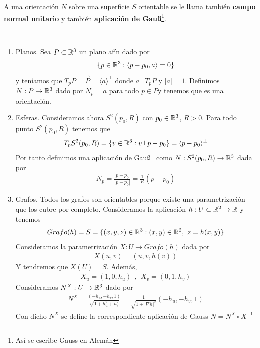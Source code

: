 \begin{notacion}
    A una orientación $N$ sobre una superficie $S$ orientable se le llama también \textbf{campo normal unitario} y también \textbf{aplicación de Gau\ss}\footnote{Así se escribe Gauss en Alemán}.
\end{notacion}

\begin{ejemplo}\
    \begin{enumerate}
        \item Planos. Sea $P\subset \mathbb{R}^3$ un plano afín dado por 
        \begin{gather*}
            \{p\in \mathbb{R}^3 : \langle p-p_0, a \rangle = 0\}
        \end{gather*}
        y teníamos que $T_pP = \vec{P}=\langle a \rangle^{\bot}$ donde $a\bot T_pP$ y $|a| = 1$. Definimos $N:P \to \mathbb{R}^3$ dado por $N_p=a$ para todo $p\in P$y tenemos que es una orientación.

        \item Esferas. Consideramos ahora $S^2(p_0, R)$ con $p_0\in \mathbb{R}^3$, $R>0$. Para todo punto $S^2(p_0, R)$ tenemos que 
        \begin{gather*}
            T_pS^2(p_0, R) = \{v\in \mathbb{R}^3 : v \bot p-p_0\} = \langle p-p_0\rangle^{\bot}
        \end{gather*}
        Por tanto definimos una aplicación de Gau\ss~ como $N:S^2(p_0, R)\to \mathbb{R}^3$ dada por 
        \begin{gather*}
            N_p = \frac{p-p_0}{|p-p_0|} = \frac{1}{R}(p-p_0)
        \end{gather*}

        \item Grafos. Todos los grafos son orientables porque existe una parametrización que los cubre por completo. Consideramos la aplicación $h:U\subset \mathbb{R}^2 \to \mathbb{R}$ y tenemos 
        \begin{gather*}
            Grafo(h)=S=\{(x,y,z)\in \bb{R}^3 : (x,y)\in \bb{R}^2, \ z=h(x,y)\}
        \end{gather*}
        Consideramos la parametrización $X:U \to Grafo(h)$ dada por 
        \begin{gather*}
            X(u,v) = (u,v,h(v))
        \end{gather*}
        Y tendremos que $X(U)=S$. Además, 
        \begin{gather*}
            X_u = (1,0,h_u)\ \ ,\ \ X_v=(0,1,h_v)
        \end{gather*}
        Consideramos $N^X:U \to \mathbb{R}^3$ dado por
        \begin{gather*}
            N^X = \frac{(-h_u, -h_v, 1)}{\sqrt{1 + h_u^2 + h_v^2}} = \frac{1}{\sqrt{1+|\nabla h|^2}} (-h_u, -h_v, 1)
        \end{gather*}
        Con dicho $N^X$ se define la correspondiente aplicación de Gauss $N=N^X \circ X^{-1}$


\end{enumerate}
\end{ejemplo}
